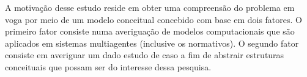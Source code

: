 A motivação desse estudo reside em obter uma compreensão do problema em voga por meio de um modelo conceitual concebido com base em dois fatores. O primeiro fator consiste numa averiguação de modelos computacionais que são aplicados em sistemas multiagentes (inclusive os normativos). O segundo fator consiste em averiguar um dado estudo de caso a fim de abstrair estruturas conceituais que possam ser do interesse dessa pesquisa.